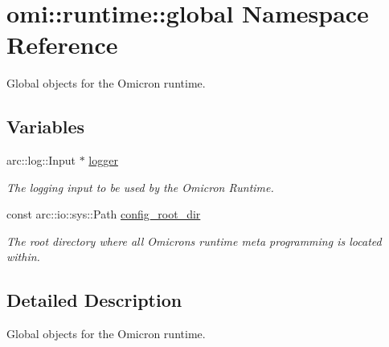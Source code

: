 \hypertarget{namespaceomi_1_1runtime_1_1global}{}\section{omi\+:\+:runtime\+:\+:global Namespace Reference}
\label{namespaceomi_1_1runtime_1_1global}


Global objects for the Omicron runtime.  


\subsection*{Variables}
\begin{DoxyCompactItemize}
\item 
arc\+::log\+::\+Input $\ast$ \hyperlink{namespaceomi_1_1runtime_1_1global_a12a44d7a45fdba6b6d18665acd856ab6}{logger}\hypertarget{namespaceomi_1_1runtime_1_1global_a12a44d7a45fdba6b6d18665acd856ab6}{}\label{namespaceomi_1_1runtime_1_1global_a12a44d7a45fdba6b6d18665acd856ab6}

\begin{DoxyCompactList}\small\item\em The logging input to be used by the Omicron Runtime. \end{DoxyCompactList}\item 
const arc\+::io\+::sys\+::\+Path \hyperlink{namespaceomi_1_1runtime_1_1global_a2e7c81739a7b2871ecb6130b044f6d8b}{config\+\_\+root\+\_\+dir}\hypertarget{namespaceomi_1_1runtime_1_1global_a2e7c81739a7b2871ecb6130b044f6d8b}{}\label{namespaceomi_1_1runtime_1_1global_a2e7c81739a7b2871ecb6130b044f6d8b}

\begin{DoxyCompactList}\small\item\em The root directory where all Omicron\textquotesingle{}s runtime meta programming is located within. \end{DoxyCompactList}\end{DoxyCompactItemize}


\subsection{Detailed Description}
Global objects for the Omicron runtime. 